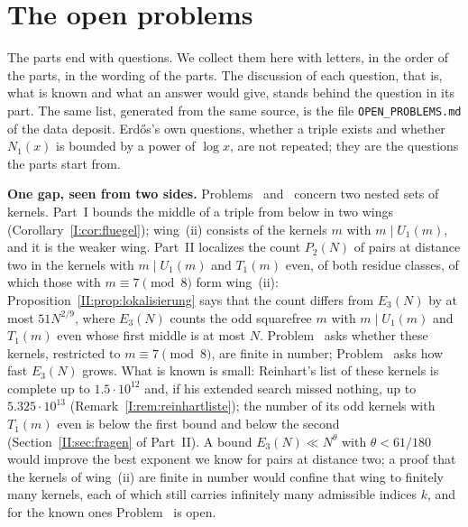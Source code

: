 \section*{The open problems}

The parts end with questions. We collect them here with letters, in the order of the parts, in the wording of the parts. The discussion of
each question, that is, what is known and what an answer would give, stands behind the question in its part. The same list, generated from
the same source, is the file \texttt{OPEN\_PROBLEMS.md} of the data deposit. Erd\H{o}s's own questions, whether a triple exists and whether
$N_1(x)$ is bounded by a power of $\log x$, are not repeated; they are the questions the parts start from.



\medskip
\noindent\textbf{One gap, seen from two sides.} Problems~ and~ concern two nested sets of kernels. Part~I bounds the middle of a
triple from below in two wings (Corollary~\ref{I:cor:fluegel}); wing~(ii) consists of the kernels $m$ with $m \mid U_1(m)$, and it is the
weaker wing. Part~II localizes the count $P_2(N)$ of pairs at distance two in the kernels with $m \mid U_1(m)$ and $T_1(m)$ even, of both
residue classes, of which those with $m \equiv 7 \pmod 8$ form wing~(ii): Proposition~\ref{II:prop:lokalisierung}
says that the count differs from $E_3(N)$ by at most $51 N^{2/9}$, where $E_3(N)$ counts the odd squarefree $m$ with $m \mid U_1(m)$ and $T_1(m)$ even whose first middle is at most $N$. Problem~ asks whether these
kernels, restricted to $m \equiv 7 \pmod 8$, are finite in number; Problem~ asks how fast $E_3(N)$ grows. What is known
is small: Reinhart's list of these kernels is complete up to $1.5 \cdot 10^{12}$ \cite[Remark~5.5]{Reinhart2023} and, if his extended
search missed nothing, up to $5.325 \cdot 10^{13}$ \cite{Reinhart2024} (Remark~\ref{I:rem:reinhartliste}); the number of its odd
kernels with $T_1(m)$ even is  below the first bound and  below the second (Section~\ref{II:sec:fragen} of Part~II). A bound $E_3(N) \ll N^\theta$ with $\theta < 61/180$ would improve the best exponent
we know for pairs at distance two; a proof that the kernels of wing~(ii) are finite in number would confine that wing to finitely many
kernels, each of which still carries infinitely many admissible indices $k$, and for the known ones Problem~ is open.

